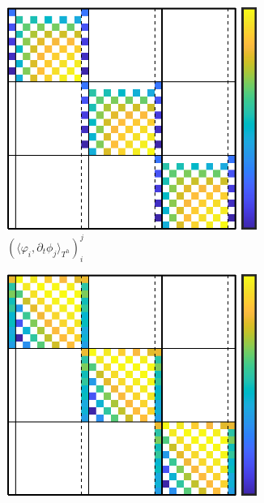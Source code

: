 \begin{example}
        \begin{figure}[!ht]
            \centering
            \begin{subfigure}{0.5\textwidth}
                \centering
                \includegraphics[width = 0.9\textwidth]{9 - finite elements in time/images/matrix 1.png}
                \caption{$(\langle\varphi_{i}, \partial_{t}\phi_{j}\rangle_{T^{h}})^{j}_{i}$}
            \end{subfigure}%
            \begin{subfigure}{0.5\textwidth}
                \centering
                \includegraphics[width = 0.9\textwidth]{9 - finite elements in time/images/matrix 2.png}

\end{subfigure}
\end{figure}
\end{example}
